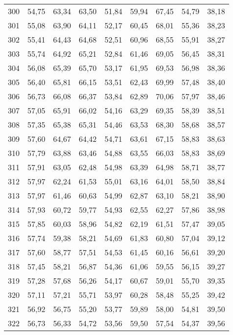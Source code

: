 \begin{longtable}{c c c c c c c c c}
      300& 	54,75& 	63,34& 	63,50& 	51,84& 	59,94& 	67,45& 	54,79& 	38,18 \\
      301& 	55,08& 	63,90& 	64,11& 	52,17& 	60,45& 	68,01& 	55,36& 	38,23 \\
      302& 	55,41& 	64,43& 	64,68& 	52,51& 	60,96& 	68,55& 	55,91& 	38,27 \\
      303& 	55,74& 	64,92& 	65,21& 	52,84& 	61,46& 	69,05& 	56,45& 	38,31 \\
      304& 	56,08& 	65,39& 	65,70& 	53,17& 	61,95& 	69,53& 	56,98& 	38,36 \\
      305& 	56,40& 	65,81& 	66,15& 	53,51& 	62,43& 	69,99& 	57,48& 	38,40 \\
      306& 	56,73& 	66,08& 	66,37& 	53,84& 	62,89& 	70,06& 	57,97& 	38,46 \\
      307& 	57,05& 	65,91& 	66,02& 	54,16& 	63,29& 	69,35& 	58,39& 	38,51 \\
      308& 	57,35& 	65,38& 	65,31& 	54,46& 	63,53& 	68,30& 	58,68& 	38,57 \\
      309& 	57,60& 	64,67& 	64,42& 	54,71& 	63,61& 	67,15& 	58,83& 	38,63 \\
      310& 	57,79& 	63,88& 	63,46& 	54,88& 	63,55& 	66,03& 	58,83& 	38,69 \\
      311& 	57,91& 	63,05& 	62,48& 	54,98& 	63,39& 	64,98& 	58,71& 	38,77 \\
      312& 	57,97& 	62,24& 	61,53& 	55,01& 	63,16& 	64,01& 	58,50& 	38,84 \\
      313& 	57,97& 	61,46& 	60,63& 	54,99& 	62,87& 	63,10& 	58,21& 	38,90 \\
      314& 	57,93& 	60,72& 	59,77& 	54,93& 	62,55& 	62,27& 	57,86& 	38,98 \\
      315& 	57,85& 	60,03& 	58,96& 	54,82& 	62,19& 	61,51& 	57,47& 	39,05 \\
      316& 	57,74& 	59,38& 	58,21& 	54,69& 	61,83& 	60,80& 	57,04& 	39,12 \\
      317& 	57,60& 	58,77& 	57,51& 	54,53& 	61,45& 	60,16& 	56,61& 	39,20 \\
      318& 	57,45& 	58,21& 	56,87& 	54,36& 	61,06& 	59,55& 	56,15& 	39,27 \\
      319& 	57,28& 	57,68& 	56,26& 	54,17& 	60,67& 	59,01& 	55,70& 	39,35 \\
      320& 	57,11& 	57,21& 	55,71& 	53,97& 	60,28& 	58,48& 	55,25& 	39,42 \\
      321& 	56,92& 	56,75& 	55,20& 	53,77& 	59,89& 	58,00& 	54,81& 	39,50 \\
      322& 	56,73& 	56,33& 	54,72& 	53,56& 	59,50& 	57,54& 	54,37& 	39,56 \\

\end{longtable}
